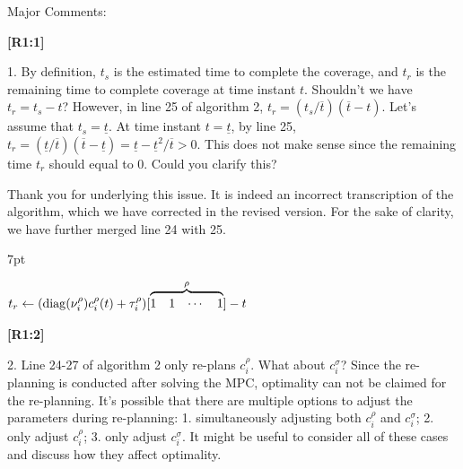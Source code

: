 \documentclass[10pt]{letter}
\newenvironment{formal}{%
  \def\FrameCommand{%
    \hspace{1pt}%
    {\color{red}\vrule width 2pt}%
    {\color{formalshade}\vrule width 4pt}%
    \colorbox{formalshade}%
  }%
  \MakeFramed{\advance\hsize-\width\FrameRestore}%
  \noindent\hspace{-4.55pt}%
  \begin{adjustwidth}{}{7pt}%
  \vspace{2pt}\vspace{2pt}%
}
{%
  \vspace{2pt}\end{adjustwidth}\endMakeFramed%
}
\begin{document}
\vspace{2em}

Major Comments:

{\hspace*{-4.5em}\textbf{[R1:1]}\vspace*{-1.9em}}

1. By definition, $t_s$ is the estimated time to complete the coverage, and $t_r$ is the remaining time to complete coverage at time instant $t$. Shouldn't we have $t_r=t_s-t$? However, in line 25 of
algorithm 2, $t_r=(t_s/\overline{t})(\overline{t}-t)$. Let's assume that $t_s=\underline{t}$. At time instant $t=\underline{t}$, by line 25, $t_r=(\underline{t}/\overline{t})(\overline{t}-\underline{t})=\underline{t}-\underline{t}^2/\overline{t}>0$. This does not make sense since the remaining time $t_r$ should equal to $0$. Could you clarify this?

{\color{blue}

{\hspace*{-4.5em}{[R1:1]}\vspace*{-1.9em}}

Thank you for underlying this issue. It is indeed an incorrect transcription of the algorithm, which we have corrected in the revised version. For the sake of clarity, we have further merged line 24 with 25.

\begin{formal}
  \begin{algorithmic}[1]
    \small
      \makeatletter
      \setcounter{ALC@line}{23}
      \makeatother
      \color{blue}\STATE $t_r\gets (\mathrm{diag}(\nu_i^\rho)\vspace*{.3ex}c_i^\rho(t)+\tau_i^\rho)[\overbrace{\begin{matrix}1&1&\cdots&1\end{matrix}}^{\rho}]-t$\vspace*{.3ex}\label{alg:traj1}
        
      \vspace*{.8ex}
    \end{algorithmic}
  \end{formal}  

}

{\hspace*{-4.5em}\textbf{[R1:2]}\vspace*{-1.9em}}

2. Line 24-27 of algorithm 2 only re-plans $c_i^\rho$. What about $c_i^\sigma$? Since the re-planning is conducted after solving the MPC, optimality can not be claimed for the re-planning. It's possible that there are multiple options to adjust the parameters during re-planning: 1. simultaneously adjusting both $c_i^\rho$ and $c_i^\sigma$; 2. only adjust $c_i^\rho$; 3. only adjust $c_i^\sigma$. It might be useful to consider all of these cases and discuss how they affect optimality.
\end{document}
